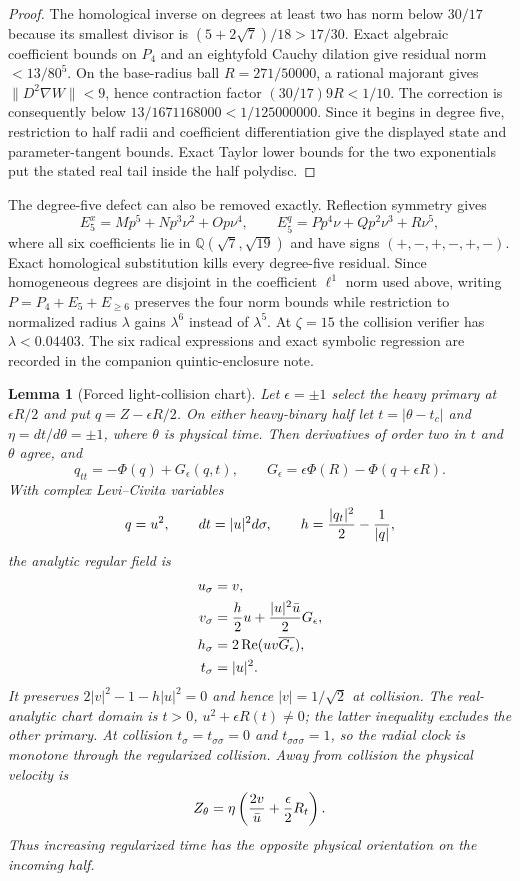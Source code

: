 \documentclass[11pt]{article}
\newtheorem{lemma}[theorem]{Lemma}
\begin{document}
\begin{proof}
The homological inverse on degrees at least two has norm below $30/17$ because
its smallest divisor is
$(5+2\sqrt7)/18>17/30$. Exact algebraic coefficient bounds on $P_4$ and an
eightyfold Cauchy dilation give residual norm $<13/80^5$. On the base-radius
ball $R=271/50000$, a rational majorant gives
$\|D^2\nabla W\|<9$, hence contraction factor
$(30/17)9R<1/10$. The correction is consequently below
$13/1671168000<1/125000000$. Since it begins in degree five, restriction to
half radii and coefficient differentiation give the displayed state and
parameter-tangent bounds. Exact Taylor lower bounds for the two exponentials
put the stated real tail inside the half polydisc.
\end{proof}

The degree-five defect can also be removed exactly.  Reflection symmetry
gives
\[
 E_5^x=Mp^5+Np^3\nu^2+Op\nu^4,
 \qquad E_5^q=Pp^4\nu+Qp^2\nu^3+R\nu^5,
\]
where all six coefficients lie in $\mathbb Q(\sqrt7,\sqrt{19})$ and have
signs $(+,-,+,-,+,-)$.  Exact homological substitution kills every
degree-five residual.  Since homogeneous degrees are disjoint in the
coefficient $\ell^1$ norm used above, writing $P=P_4+E_5+E_{\ge6}$ preserves
the four norm bounds while restriction to normalized radius $\lambda$ gains
$\lambda^6$ instead of $\lambda^5$.  At $\zeta=15$ the collision verifier
has $\lambda<0.04403$.  The six radical expressions and exact symbolic
regression are recorded in the companion quintic-enclosure note.

\begin{lemma}[Forced light-collision chart]
Let $\epsilon=\pm1$ select the heavy primary at $\epsilon R/2$ and put
$q=Z-\epsilon R/2$. On either heavy-binary half let
$t=|\theta-t_c|$ and $\eta=dt/d\theta=\pm1$, where $\theta$ is physical
time. Then derivatives of order two in $t$ and $\theta$ agree, and
\[
 q_{tt}=-\Phi(q)+G_\epsilon(q,t),\qquad
 G_\epsilon=\epsilon\Phi(R)-\Phi(q+\epsilon R).
\]
With complex Levi--Civita variables
\[
 q=u^2,\qquad dt=|u|^2d\sigma,\qquad
 h={|q_t|^2\over2}-{1\over|q|},
\]
the analytic regular field is
\[
\begin{aligned}
 u_\sigma&=v,\\
 v_\sigma&={h\over2}u+{|u|^2\bar u\over2}G_\epsilon,\\
 h_\sigma&=2\operatorname{Re}(uv\overline{G_\epsilon}),\\
 t_\sigma&=|u|^2.
\end{aligned}
\]
It preserves $2|v|^2-1-h|u|^2=0$ and hence $|v|=1/\sqrt2$ at collision.
The real-analytic chart domain is
$t>0$, $u^2+\epsilon R(t)\ne0$; the latter inequality excludes the other
primary. At collision $t_\sigma=t_{\sigma\sigma}=0$ and
$t_{\sigma\sigma\sigma}=1$, so the radial clock is monotone through the
regularized collision.
Away from collision the physical velocity is
\[
 Z_\theta=\eta\left({2v\over\bar u}+{\epsilon\over2}R_t\right).
\]
Thus increasing regularized time has the opposite physical orientation on
the incoming half.
\end{lemma}
\end{document}
